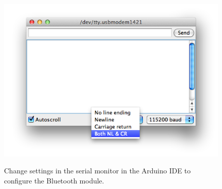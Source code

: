 		\begin{figure}[H]
			\centering
			\includegraphics[scale=0.5]{images/serial_monitor.png}
			\label{fig:serial_monitor}
			\caption{Change settings in the serial monitor in the Arduino IDE to configure the Bluetooth module.}
		\end{figure}
		
